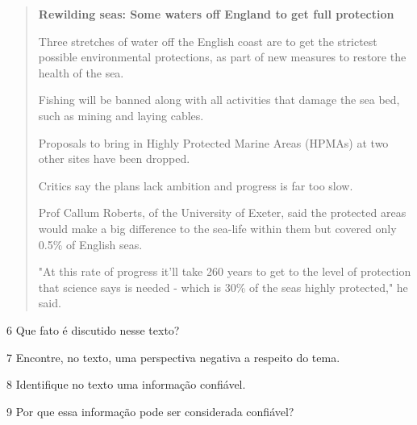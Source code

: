 \begin{quote}
\textbf{Rewilding seas: Some waters off England to get full protection}

Three stretches of water off the English coast are to get the strictest
possible environmental protections, as part of new measures to restore
the health of the sea.

Fishing will be banned along with all activities that damage the sea
bed, such as mining and laying cables.

Proposals to bring in Highly Protected Marine Areas (HPMAs) at two other
sites have been dropped.

Critics say the plans lack ambition and progress is far too slow.

Prof Callum Roberts, of the University of Exeter, said the protected
areas would make a big difference to the sea-life within them but
covered only 0.5\% of English seas.

"At this rate of progress it'll take 260 years to get to the level of
protection that science says is needed - which is 30\% of the seas
highly protected," he said.

\end{quote}


\num{6} Que fato é discutido nesse texto?



\num{7} Encontre, no texto, uma perspectiva negativa a respeito do tema.



\num{8} Identifique no texto uma informação confiável.



\num{9} Por que essa informação pode ser considerada confiável?


